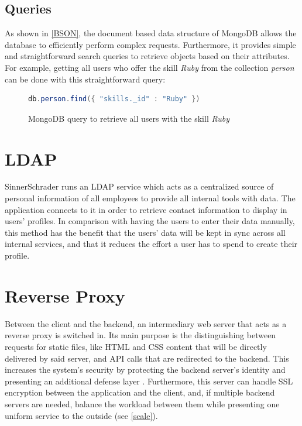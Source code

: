 \newpage

\subsection{Queries}
As shown in \ref{BSON}, the document based data structure of MongoDB allows the database to efficiently perform complex requests. Furthermore, it provides simple and straightforward search queries to retrieve objects based on their attributes. For example, getting all users who offer the skill \textit{Ruby} from the collection \textit{person} can be done with this straightforward query:
\begin{figure}[h]
\begin{lstlisting}[language=Java]
db.person.find({ "skills._id" : "Ruby" })
\end{lstlisting}
\caption[Code: Example Database Query]{MongoDB query to retrieve all users with the skill \textit{Ruby}}
\end{figure}

\section{LDAP}
SinnerSchrader runs an LDAP service which acts as a centralized source of personal information of all employees to provide all internal tools with data. The application connects to it in order to retrieve contact information to display in users' profiles. In comparison with having the users to enter their data manually, this method has the benefit that the users' data will be kept in sync across all internal services, and that it reduces the effort a user has to spend to create their profile.

\section{Reverse Proxy}
Between the client and the backend, an intermediary web server that acts as a reverse proxy is switched in. Its main purpose is the distinguishing between requests for static files, like HTML and CSS content that will be directly delivered by said server, and API calls that are redirected to the backend. This increases the system's security by protecting the backend server's identity and presenting an additional defense layer \cite{NGINX}. Furthermore, this server can handle SSL encryption between the application and the client, and, if multiple backend servers are needed, balance the workload between them while presenting one uniform service to the outside (see \ref{scale}).

